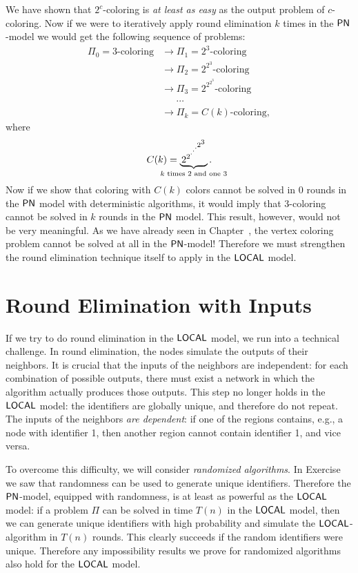 We have shown that $2^c$-coloring is \emph{at least as easy} as the output problem of $c$-coloring. 
Now if we were to iteratively apply round elimination $k$ times in the $\textup{\sffamily PN}$-model we would get the following sequence of problems:
\[\begin{split}
	\Pi_0 = 3\text{-coloring}
	&\to \Pi_1 = 2^3\text{-coloring} \\
	&\to \Pi_2 = 2^{2^3}\text{-coloring} \\
	&\to \Pi_3 = 2^{2^{2^3}}\text{-coloring} \\
	&\phantom{{}\to{}} {\cdots} \\
	&\to \Pi_k = C(k)\text{-coloring},
\end{split}\]
where
\[
	C(k) = \underbrace{\,2^{2^{\scriptstyle\cdot^{\scriptstyle\cdot^{\scriptstyle\cdot^{\scriptstyle 2^{\scriptstyle 3}}}}}}}_{\text{\makebox[0pt]{$k$ times $2$ and one $3$}}}.
\]
Now if we show that coloring with $C(k)$ colors cannot be solved in $0$ rounds in the $\textup{\sffamily PN}$ model with deterministic algorithms, it would imply that $3$-coloring cannot be solved in $k$ rounds in the $\textup{\sffamily PN}$ model. This result, however, would not be very meaningful. As we have already seen in Chapter~, the vertex coloring problem cannot be solved at all in the $\textup{\sffamily PN}$-model! Therefore we must strengthen the round elimination technique itself to apply in the $\textup{\sffamily LOCAL}$ model.

\section{Round Elimination with Inputs}

If we try to do round elimination in the $\textup{\sffamily LOCAL}$ model, we run into a technical challenge. In round elimination, the nodes simulate the outputs of their neighbors. It is crucial that the inputs of the neighbors are independent: for each combination of possible outputs, there must exist a network in which the algorithm actually produces those outputs. This step no longer holds in the $\textup{\sffamily LOCAL}$ model: the identifiers are globally unique, and therefore do not repeat. The inputs of the neighbors \emph{are dependent}: if one of the regions contains, e.g., a node with identifier 1, then another region cannot contain identifier 1, and vice versa.

To overcome this difficulty, we will consider \emph{randomized algorithms}. In Exercise~ we saw that randomness can be used to generate unique identifiers. Therefore the $\textup{\sffamily PN}$-model, equipped with randomness, is at least as powerful as the $\textup{\sffamily LOCAL}$ model: if a problem $\Pi$ can be solved in time $T(n)$ in the $\textup{\sffamily LOCAL}$ model, then we can generate unique identifiers with high probability and simulate the $\textup{\sffamily LOCAL}$-algorithm in $T(n)$ rounds. This clearly succeeds if the random identifiers were unique. Therefore any impossibility results we prove for randomized algorithms also hold for the $\textup{\sffamily LOCAL}$ model.

